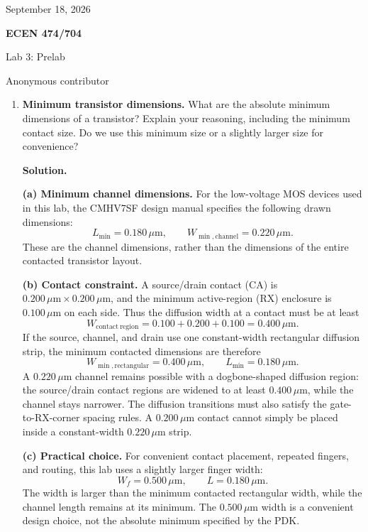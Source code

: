 \documentclass[12pt,letterpaper]{article}
\begin{document}
{\fontsize{11}{12.65}\selectfont
\hfill September 18, 2026\par}

{\centering
{\fontsize{14}{16.1}\selectfont\sffamily\bfseries
ECEN 474/704\par}
{\fontsize{14}{16.1}\selectfont Lab 3: Prelab\par}
{\fontsize{14}{16.1}\selectfont Anonymous contributor\par}
}

\vspace{12pt}

\begin{enumerate}

\item \textbf{Minimum transistor dimensions.}
What are the absolute minimum dimensions of a transistor? Explain your
reasoning, including the minimum contact size. Do we use this minimum
size or a slightly larger size for convenience?

\textbf{Solution.}

\textbf{(a) Minimum channel dimensions.}
For the low-voltage MOS devices used in this lab, the CMHV7SF design
manual specifies the following drawn dimensions:
\[
\boxed{L_{\min}=0.180\,\mu\mathrm{m},\qquad
W_{\min,\mathrm{channel}}=0.220\,\mu\mathrm{m}.}
\]
These are the channel dimensions, rather than the dimensions of the
entire contacted transistor layout.

\textbf{(b) Contact constraint.}
A source/drain contact (CA) is
$0.200\,\mu\mathrm{m}\times0.200\,\mu\mathrm{m}$, and the minimum
active-region (RX) enclosure is $0.100\,\mu\mathrm{m}$ on each side.
Thus the diffusion width at a contact must be at least
\[
W_{\mathrm{contact\ region}}
=0.100+0.200+0.100
=0.400\,\mu\mathrm{m}.
\]
If the source, channel, and drain use one constant-width rectangular
diffusion strip, the minimum contacted dimensions are therefore
\[
\boxed{W_{\min,\mathrm{rectangular}}=0.400\,\mu\mathrm{m},\qquad
L_{\min}=0.180\,\mu\mathrm{m}.}
\]
A $0.220\,\mu\mathrm{m}$ channel remains possible with a dogbone-shaped
diffusion region: the source/drain contact regions are widened to at
least $0.400\,\mu\mathrm{m}$, while the channel stays narrower.
The diffusion transitions must also satisfy the gate-to-RX-corner
spacing rules. A $0.200\,\mu\mathrm{m}$ contact cannot simply be placed
inside a constant-width $0.220\,\mu\mathrm{m}$ strip.

\textbf{(c) Practical choice.}
For convenient contact placement, repeated fingers, and routing, this
lab uses a slightly larger finger width:
\[
\boxed{W_f=0.500\,\mu\mathrm{m},\qquad L=0.180\,\mu\mathrm{m}.}
\]
The width is larger than the minimum contacted rectangular width,
while the channel length remains at its minimum. The
$0.500\,\mu\mathrm{m}$ width is a convenient design choice, not the
absolute minimum specified by the PDK.


\end{enumerate}
\end{document}
